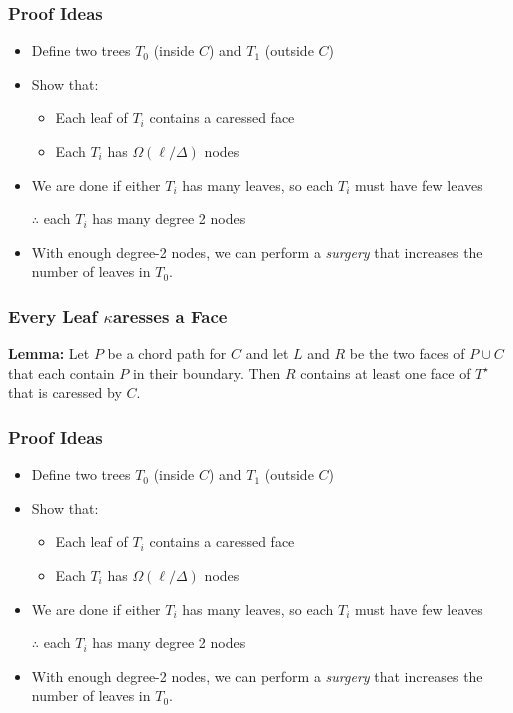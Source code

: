 \documentclass[xcolor=dvipsnames]{beamer}
\newcommand{\dual}[1]{#1^\star}
\begin{document}
\begin{frame}
  \frametitle{Proof Ideas}
  \begin{itemize}
    \item Define two trees $T_0$ (inside $C$) and $T_1$ (outside $C$)
    \item Show that:
    \begin{itemize}
      \item \alert{Each leaf of $T_i$ contains a caressed face}
      \item Each $T_i$ has $\Omega(\ell/\Delta)$ nodes
    \end{itemize}
    \item We are done if either $T_i$ has many leaves, so each $T_i$ must have few leaves
    \item[$\therefore$] each $T_i$ has many degree 2 nodes
    \item With enough degree-2 nodes, we can perform a \emph{surgery} that increases the number of leaves in $T_0$.
  \end{itemize}
\end{frame}

\begin{frame}
  \frametitle{Every Leaf $\kappa$aresses a Face}

   \noindent\textbf{Lemma:} 
   Let $P$ be a chord path for $C$ and let $L$ and $R$ be the two faces
   of $P\cup C$ that each contain $P$ in their boundary. Then $R$
   contains at least one face of $\dual{T}$ that is caressed by $C$.

  \begin{center}
  \end{center}


\end{frame}


\begin{frame}
  \frametitle{Proof Ideas}
  \begin{itemize}
    \item Define two trees $T_0$ (inside $C$) and $T_1$ (outside $C$)
    \item Show that:
    \begin{itemize}
      \item Each leaf of $T_i$ contains a caressed face
      \item Each $T_i$ has $\Omega(\ell/\Delta)$ nodes
    \end{itemize}
    \item We are done if either $T_i$ has many leaves, so each $T_i$ must have few leaves
    \item[$\therefore$] each $T_i$ has many degree 2 nodes
    \item \alert{With enough degree-2 nodes, we can perform a \emph{surgery} that increases the number of leaves in $T_0$.}
  \end{itemize}
\end{frame}
\end{document}
